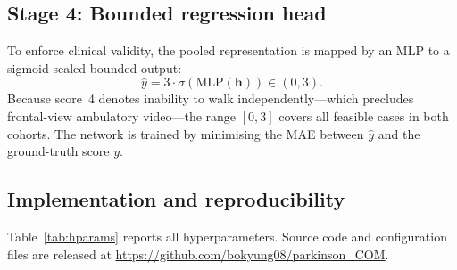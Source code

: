 \documentclass[preprint,12pt]{elsarticle}
\begin{document}
\subsection{Stage 4: Bounded regression head}
\label{sec:stage4}
To enforce clinical validity, the pooled representation is mapped by an MLP to a
sigmoid-scaled bounded output:
\begin{equation}
\hat{y}=3\cdot\sigma\!\left(\mathrm{MLP}(\mathbf{h})\right)\in(0,3).
\label{eq:bounded}
\end{equation}
Because score~4 denotes inability to walk independently---which precludes
frontal-view ambulatory video---the range $[0,3]$ covers all feasible cases in
both cohorts. The network is trained by minimising the MAE between $\hat{y}$ and
the ground-truth score $y$.

\subsection{Implementation and reproducibility}
\label{sec:repro}
Table~\ref{tab:hparams} reports all hyperparameters. Source code and
configuration files are released at
\url{https://github.com/bokyung08/parkinson_COM}.

\begin{table}[htpb]
\centering
\caption{Implementation and training hyperparameters of the proposed system.}
\label{tab:hparams}
\end{table}
\end{document}

